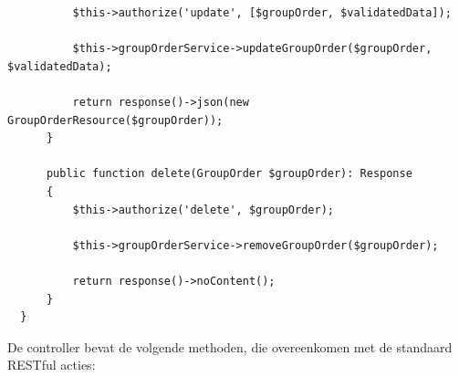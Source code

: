 \begin{verbatim}
          $this->authorize('update', [$groupOrder, $validatedData]);
  
          $this->groupOrderService->updateGroupOrder($groupOrder, $validatedData);
  
          return response()->json(new GroupOrderResource($groupOrder));
      }
  
      public function delete(GroupOrder $groupOrder): Response
      {
          $this->authorize('delete', $groupOrder);
  
          $this->groupOrderService->removeGroupOrder($groupOrder);
  
          return response()->noContent();
      }
  }
\end{verbatim}
\label{lst:groupordercontroller_class}

De controller bevat de volgende methoden, die overeenkomen met de standaard RESTful acties:

